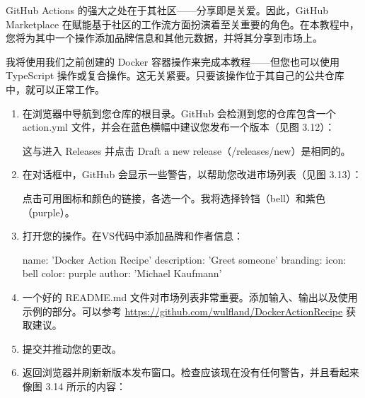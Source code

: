 GitHub Actions 的强大之处在于其社区——分享即是关爱。因此，GitHub Marketplace 在赋能基于社区的工作流方面扮演着至关重要的角色。在本教程中，您将为其中一个操作添加品牌信息和其他元数据，并将其分享到市场上。


我将使用我们之前创建的 Docker 容器操作来完成本教程——但您也可以使用 TypeScript 操作或复合操作。这无关紧要。只要该操作位于其自己的公共仓库中，就可以正常工作。


\begin{enumerate}
\item 
在浏览器中导航到您仓库的根目录。GitHub 会检测到您的仓库包含一个 action.yml 文件，并会在蓝色横幅中建议您发布一个版本（见图 3.12）：


这与进入 Releases 并点击 Draft a new release（/releases/new）是相同的。

\item 
在对话框中，GitHub 会显示一些警告，以帮助您改进市场列表（见图 3.13）：


点击可用图标和颜色的链接，各选一个。我将选择铃铛（bell）和紫色（purple）。

\item 
打开您的操作。在VS代码中添加品牌和作者信息：

\begin{shell}
name: 'Docker Action Recipe'
description: 'Greet someone'
branding:
  icon: bell
  color: purple
author: 'Michael Kaufmann'
\end{shell}

\item 
一个好的 README.md 文件对市场列表非常重要。添加输入、输出以及使用示例的部分。可以参考 \url{https://github.com/wulfland/DockerActionRecipe} 获取建议。

\item 
提交并推动您的更改。

\item 
返回浏览器并刷新新版本发布窗口。检查应该现在没有任何警告，并且看起来像图 3.14 所示的内容：



\end{enumerate}
